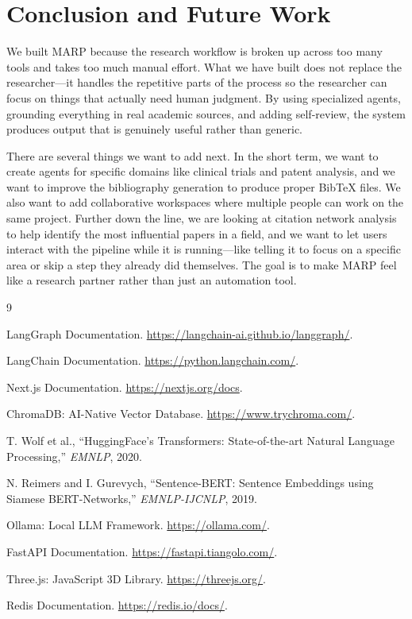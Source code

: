 \documentclass[12pt,a4paper]{article}
\begin{document}
\section{Conclusion and Future Work}

We built MARP because the research workflow is broken up across too many tools and takes too much manual effort. What we have built does not replace the researcher---it handles the repetitive parts of the process so the researcher can focus on things that actually need human judgment. By using specialized agents, grounding everything in real academic sources, and adding self-review, the system produces output that is genuinely useful rather than generic.

There are several things we want to add next. In the short term, we want to create agents for specific domains like clinical trials and patent analysis, and we want to improve the bibliography generation to produce proper BibTeX files. We also want to add collaborative workspaces where multiple people can work on the same project. Further down the line, we are looking at citation network analysis to help identify the most influential papers in a field, and we want to let users interact with the pipeline while it is running---like telling it to focus on a specific area or skip a step they already did themselves. The goal is to make MARP feel like a research partner rather than just an automation tool.

\begin{thebibliography}{9}
\setlength{\itemsep}{1pt}

LangGraph Documentation. \url{https://langchain-ai.github.io/langgraph/}.

LangChain Documentation. \url{https://python.langchain.com/}.

Next.js Documentation. \url{https://nextjs.org/docs}.

ChromaDB: AI-Native Vector Database. \url{https://www.trychroma.com/}.

T. Wolf et al., ``HuggingFace's Transformers: State-of-the-art Natural Language Processing,'' \textit{EMNLP}, 2020.

N. Reimers and I. Gurevych, ``Sentence-BERT: Sentence Embeddings using Siamese BERT-Networks,'' \textit{EMNLP-IJCNLP}, 2019.

Ollama: Local LLM Framework. \url{https://ollama.com/}.

FastAPI Documentation. \url{https://fastapi.tiangolo.com/}.

Three.js: JavaScript 3D Library. \url{https://threejs.org/}.

Redis Documentation. \url{https://redis.io/docs/}.

\end{thebibliography}
\end{document}

